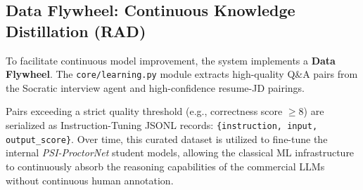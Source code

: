 \subsection{Data Flywheel: Continuous Knowledge Distillation (RAD)}
To facilitate continuous model improvement, the system implements a \textbf{Data Flywheel}. The \texttt{core/learning.py} module extracts high-quality Q\&A pairs from the Socratic interview agent and high-confidence resume-JD pairings. 

Pairs exceeding a strict quality threshold (e.g., correctness score $\geq 8$) are serialized as Instruction-Tuning JSONL records: \texttt{\{instruction, input, output\_score\}}. Over time, this curated dataset is utilized to fine-tune the internal \textit{PSI-ProctorNet} student models, allowing the classical ML infrastructure to continuously absorb the reasoning capabilities of the commercial LLMs without continuous human annotation.
